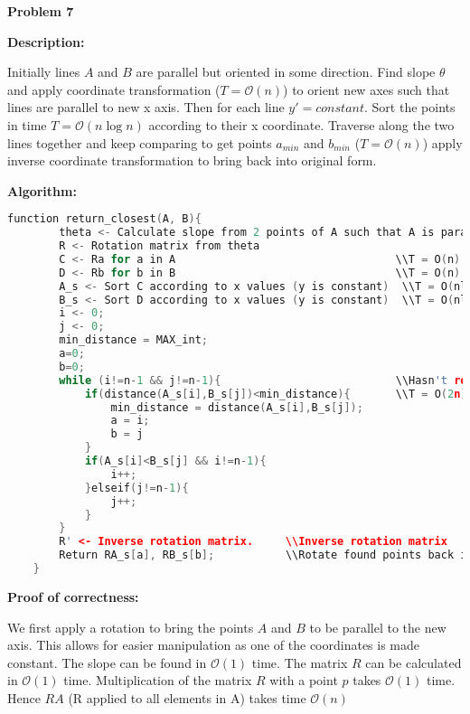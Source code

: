 \documentclass[10pt, a4paper]{article}
\newcommand{\BigO}{\mathcal{O}}
\begin{document}
\newpage
\noindent\large{\textbf{Problem 7}}
\vspace{5pt}
\normalsize

\noindent\textbf{Description:}

Initially lines $A$ and $B$ are parallel but oriented in some direction. Find slope $\theta$ and apply coordinate transformation ($T = \BigO(n)$) to orient new axes such that lines are parallel to new x axis. Then for each line $y' = constant$. Sort the points in time $T = \BigO(n\log n)$ according to their x coordinate. Traverse along the two lines together and keep comparing to get points $a_{min}$ and $b_{min}$ ($T=\BigO(n)$) apply inverse coordinate transformation to bring back into original form.

\noindent\textbf{Algorithm:}
\begin{lstlisting}[language=C++,caption=Closest points]
    function return_closest(A, B){
        theta <- Calculate slope from 2 points of A such that A is parallel to new x axis.
        R <- Rotation matrix from theta
        C <- Ra for a in A                                  \\T = O(n)
        D <- Rb for b in B                                  \\T = O(n)
        A_s <- Sort C according to x values (y is constant)  \\T = O(nlogn)
        B_s <- Sort D according to x values (y is constant)  \\T = O(nlogn)
        i <- 0;
        j <- 0;
        min_distance = MAX_int;
        a=0;
        b=0;                                
        while (i!=n-1 && j!=n-1){                           \\Hasn't reached edges
            if(distance(A_s[i],B_s[j])<min_distance){       \\T = O(2n) = O(n)
                min_distance = distance(A_s[i],B_s[j]);
                a = i;
                b = j
            }
            if(A_s[i]<B_s[j] && i!=n-1){
                i++;
            }elseif(j!=n-1){
                j++;
            }
        }
        R' <- Inverse rotation matrix.     \\Inverse rotation matrix
        Return RA_s[a], RB_s[b];           \\Rotate found points back into desired coordinates
    } 
\end{lstlisting}

\noindent\textbf{Proof of correctness:}

We first apply a rotation to bring the points $A$ and $B$ to be parallel to the new axis. This allows for easier manipulation as one of the coordinates is made constant. The slope can be found in $\BigO(1)$ time. The matrix $R$ can be calculated in $\BigO(1)$ time. Multiplication of the matrix $R$ with a point $p$ takes $\BigO(1)$ time. Hence $RA$ (R applied to all elements in A) takes time $\BigO(n)$ 
\end{document}
